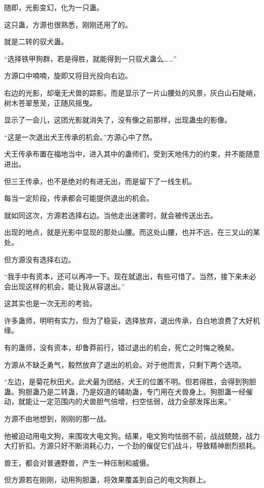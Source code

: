 \begin{this_body}
随即，光影变幻，化为一只蛊。

这只蛊，方源也很熟悉，刚刚还用了的。

就是二转的驭犬蛊。

“选择铁甲狗群，若是得胜，就能得到一只驭犬蛊么……”

方源口中喃喃，旋即又将目光投向右边。

右边的光影，却毫无犬兽的踪影。而是显示了一片山腰处的风景，灰白山石陡峭，树木苍翠葱茏，正随风摇曳。

显示了一会儿，这团光影就消失了，没有像之前那样，出现蛊虫的影像。

“这是一次退出犬王传承的机会。”方源心中了然。

犬王传承布置在福地当中，进入其中的蛊师们，受到天地伟力的约束，并不能随意进出。

但三王传承，也不是绝对的有进无出，而是留下了一线生机。

每当一定阶段，传承都会可能提供退出的机会。

就如同这次，方源若选择右边。当他走出迷雾时，就会被传送出去。

出现的地点，就是光影中显现的那处山腰。而这处山腰，也并不远，在三叉山的某处。

但方源没有选择右边。

“我手中有资本，还可以再冲一下。现在就退出，有些可惜了。当然，接下来未必会出现这样的机会，能让我从容退出。”

这其实也是一次无形的考验。

许多蛊师，明明有实力，但为了稳妥，选择放弃，退出传承，白白地浪费了大好机缘。

有的蛊师，没有资本，却鲁莽前行，错过退出的机会，死亡之时悔之晚矣。

方源从不缺乏勇气，毅然放弃了退出的机会。对于他而言，只剩下两个选项。

“左边，是菊花秋田犬。此犬最为团结，犬王的位置不明。但若得胜，会得到狗胆蛊。狗胆蛊乃是二转蛊，乃是奴道的辅助蛊，专门用在犬兽身上。狗胆蛊一经催动，就能让一定范围内的犬兽胆气倍增，扫空怯弱，战力全部发挥出来。”

方源不由地想到，刚刚的那一战。

他被迫动用电文狗，来围攻大电文狗。结果，电文狗均怯弱不前，战战兢兢，战力大打折扣。方源只好不断消耗心力，一个劲的催促它们战斗，导致精神剧烈损耗。

兽王，都会对普通野兽，产生一种压制和威慑。

但方源若在刚刚，动用狗胆蛊，将效果覆盖到自己的电文狗群上。


\end{this_body}
